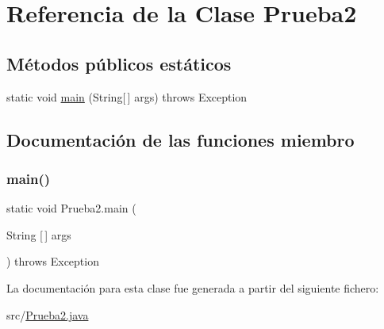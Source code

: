 \hypertarget{class_prueba2}{}\section{Referencia de la Clase Prueba2}
\label{class_prueba2}
\subsection*{Métodos públicos estáticos}
\begin{DoxyCompactItemize}
\item 
static void \mbox{\hyperlink{class_prueba2_aad3b9aecc82daf855b4f3290bb958cf7}{main}} (String\mbox{[}$\,$\mbox{]} args)  throws Exception 
\end{DoxyCompactItemize}


\subsection{Documentación de las funciones miembro}
\mbox{\label{class_prueba2_aad3b9aecc82daf855b4f3290bb958cf7}} 
\subsubsection{\texorpdfstring{main()}{main()}}
{\footnotesize\ttfamily static void Prueba2.\+main (\begin{DoxyParamCaption}\item[{String \mbox{[}$\,$\mbox{]}}]{args }\end{DoxyParamCaption}) throws Exception\hspace{0.3cm}{\ttfamily [static]}}



La documentación para esta clase fue generada a partir del siguiente fichero\+:\begin{DoxyCompactItemize}
\item 
src/\mbox{\hyperlink{_prueba2_8java}{Prueba2.\+java}}\end{DoxyCompactItemize}
